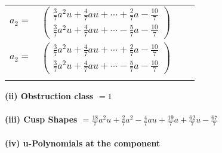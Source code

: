 \documentclass[1p]{elsarticle_modified}
\theoremstyle{definition}
\begin{document}
\begin{tabular}{m{7pt} m{180pt} m{7pt} m{180pt} }
\flushright $a_{2}=$&$\begin{pmatrix}\frac{3}{7} a^2 u+\frac{4}{7} a u+\cdots+\frac{2}{7} a-\frac{10}{7}\\\frac{3}{7} a^2 u+\frac{4}{7} a u+\cdots-\frac{5}{7} a-\frac{10}{7}\end{pmatrix}$\\ \flushright $a_{2}=$&$\begin{pmatrix}\frac{3}{7} a^2 u+\frac{4}{7} a u+\cdots+\frac{2}{7} a-\frac{10}{7}\\\frac{3}{7} a^2 u+\frac{4}{7} a u+\cdots-\frac{5}{7} a-\frac{10}{7}\end{pmatrix}$\\&\end{tabular}
\flushleft \textbf{(ii) Obstruction class $= 1$}\\~\\
\flushleft \textbf{(iii) Cusp Shapes $= \frac{18}{7} a^2 u+\frac{2}{7} a^2-\frac{4}{7} a u+\frac{19}{7} a+\frac{62}{7} u-\frac{67}{7}$}\\~\\
\newpage\renewcommand{\arraystretch}{1}
\flushleft \textbf{(iv) u-Polynomials at the component}\newline \\
\end{document}
